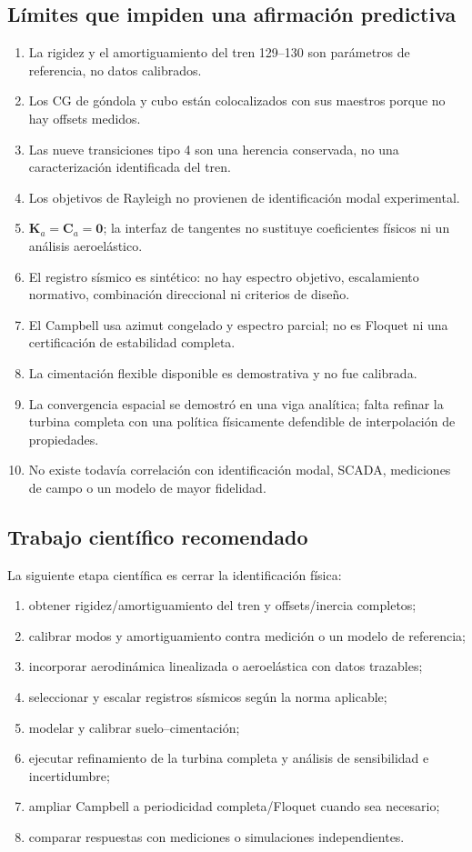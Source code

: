 \documentclass[oneside,a4paper,spanish,links]{amca}
\begin{document}
\subsection{Límites que impiden una afirmación predictiva}

\begin{enumerate}
\item La rigidez y el amortiguamiento del tren 129--130 son parámetros de referencia, no datos calibrados.
\item Los CG de góndola y cubo están colocalizados con sus maestros porque no hay offsets medidos.
\item Las nueve transiciones tipo 4 son una herencia conservada, no una caracterización identificada del tren.
\item Los objetivos de Rayleigh no provienen de identificación modal experimental.
\item $\bm K_a=\bm C_a=\bm0$; la interfaz de tangentes no sustituye coeficientes físicos ni un análisis aeroelástico.
\item El registro sísmico es sintético: no hay espectro objetivo, escalamiento normativo, combinación direccional ni criterios de diseño.
\item El Campbell usa azimut congelado y espectro parcial; no es Floquet ni una certificación de estabilidad completa.
\item La cimentación flexible disponible es demostrativa y no fue calibrada.
\item La convergencia espacial se demostró en una viga analítica; falta refinar la turbina completa con una política físicamente defendible de interpolación de propiedades.
\item No existe todavía correlación con identificación modal, SCADA, mediciones de campo o un modelo de mayor fidelidad.
\end{enumerate}

\subsection{Trabajo científico recomendado}

La siguiente etapa científica es cerrar la identificación física:

\begin{enumerate}
\item obtener rigidez/amortiguamiento del tren y offsets/inercia completos;
\item calibrar modos y amortiguamiento contra medición o un modelo de referencia;
\item incorporar aerodinámica linealizada o aeroelástica con datos trazables;
\item seleccionar y escalar registros sísmicos según la norma aplicable;
\item modelar y calibrar suelo--cimentación;
\item ejecutar refinamiento de la turbina completa y análisis de sensibilidad e incertidumbre;
\item ampliar Campbell a periodicidad completa/Floquet cuando sea necesario;
\item comparar respuestas con mediciones o simulaciones independientes.
\end{enumerate}

\FloatBarrier

\end{document}
